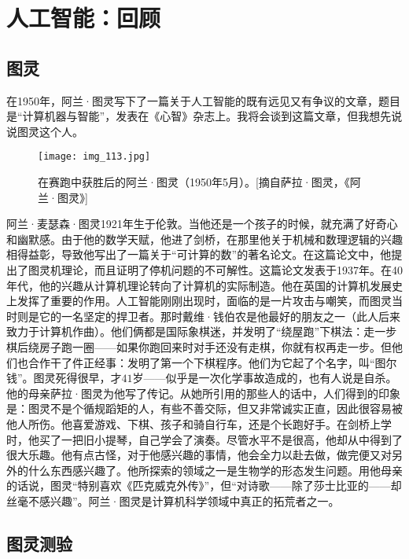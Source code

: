 
\chapter{人工智能：回顾}

\section{图灵}

在1950年，阿兰·图灵写下了一篇关于人工智能的既有远见又有争议的文章，题目是“计算机器与智能”，发表在《心智》杂志上。我将会谈到这篇文章，但我想先说说图灵这个人。

\begin{figure}
\texttt{[image: img\_113.jpg]}
\caption[阿兰·图灵。]
  {在赛跑中获胜后的阿兰·图灵（1950年5月）。[摘自萨拉·图灵，《阿兰·图灵》]}
\end{figure}

阿兰·麦瑟森·图灵1921年生于伦敦。当他还是一个孩子的时候，就充满了好奇心和幽默感。由于他的数学天赋，他进了剑桥，在那里他关于机械和数理逻辑的兴趣相得益彰，导致他写出了一篇关于“可计算的数”的著名论文。在这篇论文中，他提出了图灵机理论，而且证明了停机问题的不可解性。这篇论文发表于1937年。在40年代，他的兴趣从计算机理论转向了计算机的实际制造。他在英国的计算机发展史上发挥了重要的作用。人工智能刚刚出现时，面临的是一片攻击与嘲笑，而图灵当时则是它的一名坚定的捍卫者。那时戴维·钱伯农是他最好的朋友之一（此人后来致力于计算机作曲）。他们俩都是国际象棋迷，并发明了“绕屋跑”下棋法：走一步棋后绕房子跑一圈——如果你跑回来时对手还没有走棋，你就有权再走一步。但他们也合作干了件正经事：发明了第一个下棋程序。他们为它起了个名字，叫“图尔钱”。图灵死得很早，才$41$岁——似乎是一次化学事故造成的，也有人说是自杀。他的母亲萨拉·图灵为他写了传记。从她所引用的那些人的话中，人们得到的印象是：图灵不是个循规蹈矩的人，有些不善交际，但又非常诚实正直，因此很容易被他人所伤。他喜爱游戏、下棋、孩子和骑自行车，还是个长跑好手。在剑桥上学时，他买了一把旧小提琴，自己学会了演奏。尽管水平不是很高，他却从中得到了很大乐趣。他有点古怪，对于他感兴趣的事情，他会全力以赴去做，做完便又对另外的什么东西感兴趣了。他所探索的领域之一是生物学的形态发生问题。用他母亲的话说，图灵“特别喜欢《匹克威克外传》”，但“对诗歌——除了莎士比亚的——却丝毫不感兴趣”。阿兰·图灵是计算机科学领域中真正的拓荒者之一。

\section{图灵测验}

